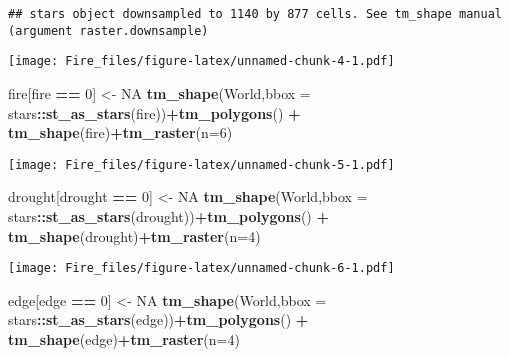 \documentclass[
]{article}
\newenvironment{Shaded}{\begin{snugshade}}{\end{snugshade}}
\newcommand{\AttributeTok}[1]{\textcolor[rgb]{0.13,0.29,0.53}{#1}}
\newcommand{\ConstantTok}[1]{\textcolor[rgb]{0.56,0.35,0.01}{#1}}
\newcommand{\DecValTok}[1]{\textcolor[rgb]{0.00,0.00,0.81}{#1}}
\newcommand{\FunctionTok}[1]{\textcolor[rgb]{0.13,0.29,0.53}{\textbf{#1}}}
\newcommand{\NormalTok}[1]{#1}
\newcommand{\OtherTok}[1]{\textcolor[rgb]{0.56,0.35,0.01}{#1}}
\newcommand{\SpecialCharTok}[1]{\textcolor[rgb]{0.81,0.36,0.00}{\textbf{#1}}}
\begin{document}
\begin{verbatim}
## stars object downsampled to 1140 by 877 cells. See tm_shape manual (argument raster.downsample)
\end{verbatim}

\texttt{[image: Fire\_files/figure-latex/unnamed-chunk-4-1.pdf]}

\begin{Shaded}
\begin{Highlighting}[]
\NormalTok{fire[fire }\SpecialCharTok{==} \DecValTok{0}\NormalTok{] }\OtherTok{\textless{}{-}} \ConstantTok{NA}
\FunctionTok{tm\_shape}\NormalTok{(World,}\AttributeTok{bbox =}\NormalTok{ stars}\SpecialCharTok{::}\FunctionTok{st\_as\_stars}\NormalTok{(fire))}\SpecialCharTok{+}\FunctionTok{tm\_polygons}\NormalTok{() }\SpecialCharTok{+}
  \FunctionTok{tm\_shape}\NormalTok{(fire)}\SpecialCharTok{+}\FunctionTok{tm\_raster}\NormalTok{(}\AttributeTok{n=}\DecValTok{6}\NormalTok{)}
\end{Highlighting}
\end{Shaded}

\texttt{[image: Fire\_files/figure-latex/unnamed-chunk-5-1.pdf]}

\begin{Shaded}
\begin{Highlighting}[]
\NormalTok{drought[drought }\SpecialCharTok{==} \DecValTok{0}\NormalTok{] }\OtherTok{\textless{}{-}} \ConstantTok{NA}
\FunctionTok{tm\_shape}\NormalTok{(World,}\AttributeTok{bbox =}\NormalTok{ stars}\SpecialCharTok{::}\FunctionTok{st\_as\_stars}\NormalTok{(drought))}\SpecialCharTok{+}\FunctionTok{tm\_polygons}\NormalTok{() }\SpecialCharTok{+}
  \FunctionTok{tm\_shape}\NormalTok{(drought)}\SpecialCharTok{+}\FunctionTok{tm\_raster}\NormalTok{(}\AttributeTok{n=}\DecValTok{4}\NormalTok{)}
\end{Highlighting}
\end{Shaded}

\texttt{[image: Fire\_files/figure-latex/unnamed-chunk-6-1.pdf]}

\begin{Shaded}
\begin{Highlighting}[]
\NormalTok{edge[edge }\SpecialCharTok{==} \DecValTok{0}\NormalTok{] }\OtherTok{\textless{}{-}} \ConstantTok{NA}
\FunctionTok{tm\_shape}\NormalTok{(World,}\AttributeTok{bbox =}\NormalTok{ stars}\SpecialCharTok{::}\FunctionTok{st\_as\_stars}\NormalTok{(edge))}\SpecialCharTok{+}\FunctionTok{tm\_polygons}\NormalTok{() }\SpecialCharTok{+}
  \FunctionTok{tm\_shape}\NormalTok{(edge)}\SpecialCharTok{+}\FunctionTok{tm\_raster}\NormalTok{(}\AttributeTok{n=}\DecValTok{4}\NormalTok{)}
\end{Highlighting}
\end{Shaded}
\end{document}
